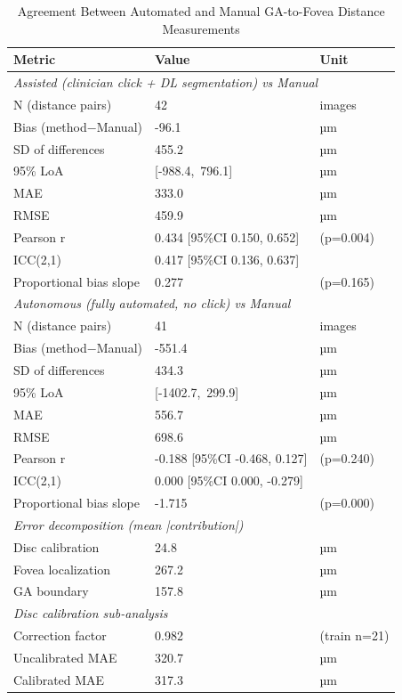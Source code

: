 \begin{table}[h]
\centering
\caption{Agreement Between Automated and Manual GA-to-Fovea Distance Measurements}
\label{tab:bland-altman}
\begin{tabular}{lll}
\hline
\textbf{Metric} & \textbf{Value} & \textbf{Unit} \\
\hline
\multicolumn{3}{l}{\textit{Assisted (clinician click + DL segmentation) vs Manual}} \\
\hline
N (distance pairs) & 42 & images \\
Bias (method$-$Manual) & -96.1 & µm \\
SD of differences & 455.2 & µm \\
95\% LoA & [-988.4,\ 796.1] & µm \\
MAE & 333.0 & µm \\
RMSE & 459.9 & µm \\
Pearson r & 0.434 [95\%CI 0.150, 0.652] & (p=0.004) \\
ICC(2,1) & 0.417 [95\%CI 0.136, 0.637] & \\
Proportional bias slope & 0.277 & (p=0.165) \\
\hline
\multicolumn{3}{l}{\textit{Autonomous (fully automated, no click) vs Manual}} \\
\hline
N (distance pairs) & 41 & images \\
Bias (method$-$Manual) & -551.4 & µm \\
SD of differences & 434.3 & µm \\
95\% LoA & [-1402.7,\ 299.9] & µm \\
MAE & 556.7 & µm \\
RMSE & 698.6 & µm \\
Pearson r & -0.188 [95\%CI -0.468, 0.127] & (p=0.240) \\
ICC(2,1) & 0.000 [95\%CI 0.000, -0.279] & \\
Proportional bias slope & -1.715 & (p=0.000) \\
\hline
\multicolumn{3}{l}{\textit{Error decomposition (mean |contribution|)}} \\
Disc calibration & 24.8 & µm \\
Fovea localization & 267.2 & µm \\
GA boundary & 157.8 & µm \\
\hline
\multicolumn{3}{l}{\textit{Disc calibration sub-analysis}} \\
Correction factor & 0.982 & (train n=21) \\
Uncalibrated MAE & 320.7 & µm \\
Calibrated MAE & 317.3 & µm \\
\hline
\end{tabular}
\end{table}
